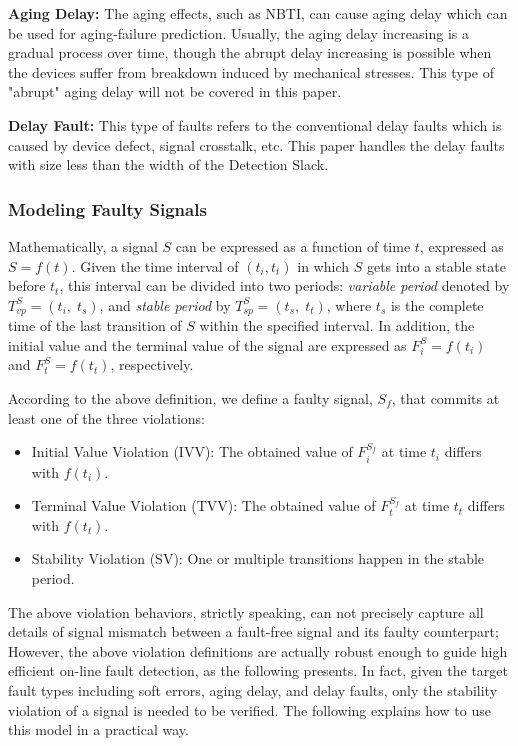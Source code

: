 {\bf Aging Delay:} The aging effects, such as NBTI, can cause aging delay which can be used for aging-failure prediction\cite{agarwal2007circuit}. Usually, the aging delay increasing is a gradual process over time, though the abrupt delay increasing is possible when the devices suffer from breakdown induced by mechanical stresses. This type of "abrupt" aging delay will not be covered in this paper.

{\bf Delay Fault:} This type of faults refers to the conventional delay faults \cite{favalli1996sensing} which is caused by device defect, signal crosstalk, etc. This
paper handles the delay faults with size less than the width of the Detection Slack.

\subsubsection{Modeling Faulty Signals}
Mathematically, a signal $S$ can be expressed as a function of time $t$, expressed as $S = f(t)$. Given the time interval of $(t_i, t_t)$ in which $S$ gets into a stable state before $t_t$, this interval can be divided into two periods: \emph{variable period} denoted by $T_{vp}^S=(t_i,\;t_{s})$, and \emph{stable period} by $T_{sp}^S=(t_{s},\;t_{t})$, where $t_{s}$ is the complete time of the last transition of $S$ within the specified interval. In addition, the initial value and the terminal value of the signal are expressed as $F_i^S = f(t_i)$ and $F_t^S=f(t_t)$, respectively.

According to the above definition, we define a faulty signal, $S_f$, that commits at least one of the three violations:
\begin{itemize}
  \item Initial Value Violation (IVV): The obtained value of $F_i^{S_f}$ at time $t_i$ differs with
   $f(t_i)$.
  \item Terminal Value Violation (TVV): The obtained value of $F_t^{S_f}$ at time $t_t$ differs with
   $f(t_t)$.
  \item Stability Violation (SV): One or multiple transitions happen in the stable period.
\end{itemize}


The above violation behaviors, strictly speaking, can not precisely capture all details of signal mismatch between a fault-free signal and its faulty counterpart; However, the above violation definitions are actually robust enough to guide high efficient on-line fault detection, as the following presents. In fact, given the target fault types including soft errors, aging delay, and delay faults, only the stability violation of a signal is needed to be verified. The following explains how to use this model in a practical way.

